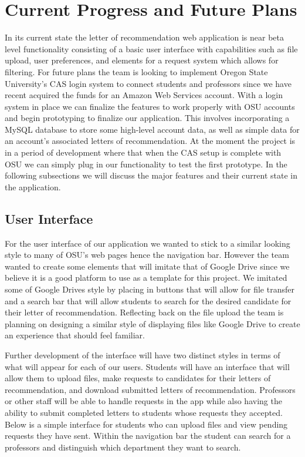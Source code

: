 \documentclass[draftclsnofoot, onecolumn, letterpaper, 10pt]{IEEEtran}
\begin{document}
\section{Current Progress and Future Plans}
In its current state the letter of recommendation web application is near beta level functionality consisting of a basic user interface with capabilities such as file upload, user preferences, and elements for a request system which allows for filtering. For future plans the team is looking to implement Oregon State University's CAS login system to connect students and professors since we have recent acquired the funds for an Amazon Web Services account. With a login system in place we can finalize the features to work properly with OSU accounts and begin prototyping to finalize our application. This involves incorporating a MySQL database to store some high-level account data, as well as simple data for an account's associated letters of recommendation. At the moment the project is in a period of development where that when the CAS setup is complete with OSU we can simply plug in our functionality to test the first prototype. In the following subsections we will discuss the major features and their current state in the application. 

\subsection{User Interface}
For the user interface of our application we wanted to stick to a similar looking style to many of OSU's web pages hence the navigation bar. However the team wanted to create some elements that will imitate that of Google Drive since we believe it is a good platform to use as a template for this project. We imitated some of Google Drives style by placing in buttons that will allow for file transfer and a search bar that will allow students to search for the desired candidate for their letter of recommendation. Reflecting back on the file upload the team is planning on designing a similar style of displaying files like Google Drive to create an experience that should feel familiar. 

Further development of the interface will have two distinct styles in terms of what will appear for each of our users. Students will have an interface that will allow them to upload files, make requests to candidates for their letters of recommendation, and download submitted letters of recommendation. Professors or other staff will be able to handle requests in the app while also having the ability to submit completed letters to students whose requests they accepted. Below is a simple interface for students who can upload files and view pending requests they have sent. Within the navigation bar the student can search for a professors and distinguish which department they want to search. 
\end{document}
